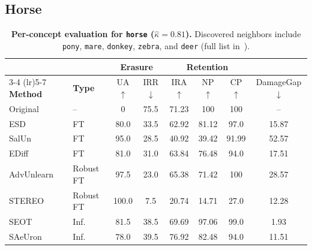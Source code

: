 \subsection{Horse}
\label{app:per_concept_horse}

\begin{table}[h]
\centering
\small
\setlength{\tabcolsep}{5pt}
\begin{tabular}{llcccccc}
\toprule
& & \multicolumn{2}{c}{\textbf{Erasure}} & \multicolumn{3}{c}{\textbf{Retention}} & \\
\cmidrule(lr){3-4} \cmidrule(lr){5-7}
\textbf{Method} & \textbf{Type} & UA$\uparrow$ & IRR$\downarrow$ & IRA$\uparrow$ & NP$\uparrow$ & CP$\uparrow$ & DamageGap$\downarrow$ \\
\midrule
Original    & --          & 0     & 75.5  & 71.23 & 100   & 100   & --    \\
\midrule
ESD         & FT          & 80.0  & 33.5  & 62.92 & 81.12 & 97.0  & 15.87 \\
SalUn       & FT          & 95.0  & 28.5  & 40.92 & 39.42 & 91.99 & 52.57 \\
EDiff       & FT          & 81.0  & 31.0  & 63.84 & 76.48 & 94.0  & 17.51 \\
\midrule
AdvUnlearn  & Robust FT   & 97.5  & 23.0  & 65.38 & 71.42 & 100   & 28.57 \\
STEREO      & Robust FT   & 100.0 & 7.5   & 20.74 & 14.71 & 27.0  & 12.28 \\
\midrule
SEOT        & Inf.        & 81.5  & 38.5  & 69.69 & 97.06 & 99.0  & 1.93  \\
SAeUron     & Inf.        & 78.0  & 39.5  & 76.92 & 82.48 & 94.0  & 11.51 \\
\bottomrule
\end{tabular}
\caption{\textbf{Per-concept evaluation for \texttt{horse} ($\hat\kappa = 0.81$).} Discovered neighbors include \texttt{pony}, \texttt{mare}, \texttt{donkey}, \texttt{zebra}, and \texttt{deer} (full list in~).}
\label{tab:per_concept_horse}
\end{table}

